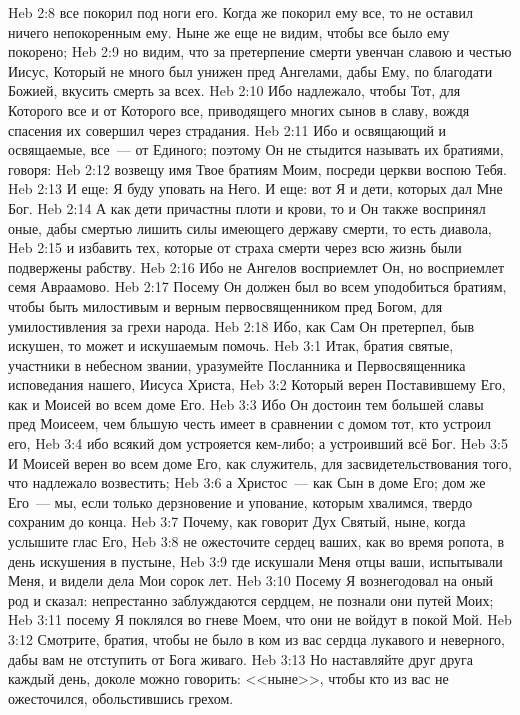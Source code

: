 \vs Heb 2:8 все покорил под ноги его. Когда же покорил ему все, то не оставил ничего непокоренным ему. Ныне же еще не видим, чтобы все было ему покорено;
\vs Heb 2:9 но видим, что за претерпение смерти увенчан славою и честью Иисус, Который не много был унижен пред Ангелами, дабы Ему, по благодати Божией, вкусить смерть за всех.
\vs Heb 2:10 Ибо надлежало, чтобы Тот, для Которого все и от Которого все, приводящего многих сынов в славу, вождя спасения их совершил через страдания.
\vs Heb 2:11 Ибо и освящающий и освящаемые, все~--- от Единого; поэтому Он не стыдится называть их братиями, говоря:
\vs Heb 2:12 возвещу имя Твое братиям Моим, посреди церкви воспою Тебя.
\vs Heb 2:13 И еще: Я буду уповать на Него. И еще: вот Я и дети, которых дал Мне Бог.
\vs Heb 2:14 А как дети причастны плоти и крови, то и Он также воспринял оные, дабы смертью лишить силы имеющего державу смерти, то есть диавола,
\vs Heb 2:15 и избавить тех, которые от страха смерти через всю жизнь были подвержены рабству.
\vs Heb 2:16 Ибо не Ангелов восприемлет Он, но восприемлет семя Авраамово.
\vs Heb 2:17 Посему Он должен был во всем уподобиться братиям, чтобы быть милостивым и верным первосвященником пред Богом, для умилостивления за грехи народа.
\vs Heb 2:18 Ибо, как Сам Он претерпел, быв искушен, то может и искушаемым помочь.
\vs Heb 3:1 Итак, братия святые, участники в небесном звании, уразумейте Посланника и Первосвященника исповедания нашего, Иисуса Христа,
\vs Heb 3:2 Который верен Поставившему Его, как и Моисей во всем доме Его.
\vs Heb 3:3 Ибо Он достоин тем большей славы пред Моисеем, чем бльшую честь имеет в сравнении с домом тот, кто устроил его,
\vs Heb 3:4 ибо всякий дом устрояется кем-либо; а устроивший всё  Бог.
\vs Heb 3:5 И Моисей верен во всем доме Его, как служитель, для засвидетельствования того, что надлежало возвестить;
\vs Heb 3:6 а Христос~--- как Сын в доме Его; дом же Его~--- мы, если только дерзновение и упование, которым хвалимся, твердо сохраним до конца.
\vs Heb 3:7 Почему, как говорит Дух Святый, ныне, когда услышите глас Его,
\vs Heb 3:8 не ожесточите сердец ваших, как во время ропота, в день искушения в пустыне,
\vs Heb 3:9 где искушали Меня отцы ваши, испытывали Меня, и видели дела Мои сорок лет.
\vs Heb 3:10 Посему Я вознегодовал на оный род и сказал: непрестанно заблуждаются сердцем, не познали они путей Моих;
\vs Heb 3:11 посему Я поклялся во гневе Моем, что они не войдут в покой Мой.
\rsbpar\vs Heb 3:12 Смотрите, братия, чтобы не было в ком из вас сердца лукавого и неверного, дабы вам не отступить от Бога живаго.
\vs Heb 3:13 Но наставляйте друг друга каждый день, доколе можно говорить: <<ныне>>, чтобы кто из вас не ожесточился, обольстившись грехом.
